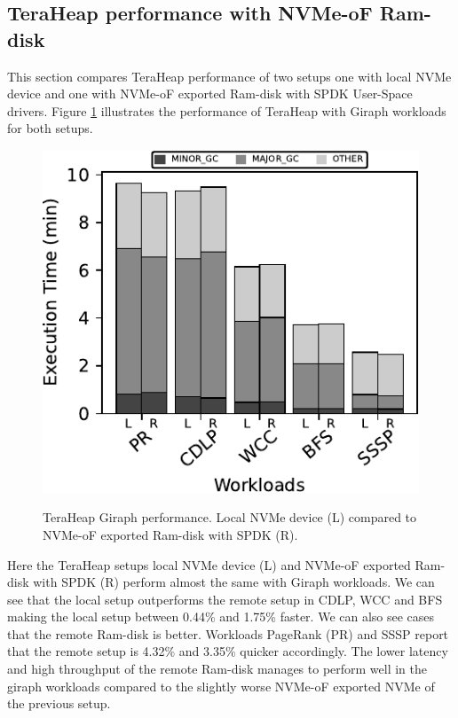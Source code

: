 \subsection{TeraHeap performance with NVMe-oF Ram-disk}
\par This section compares TeraHeap performance of two setups one with local NVMe device and one with NVMe-oF exported Ram-disk with SPDK User-Space drivers. Figure \ref{fig:ram_giraph} illustrates the performance of TeraHeap with Giraph workloads for both setups.
\begin{figure}[H]
  \includegraphics[width=\linewidth]{figures/ram_giraph.pdf}\\
\caption{TeraHeap Giraph performance. Local NVMe device (L) compared to NVMe-oF exported Ram-disk with SPDK (R).}
\label{fig:ram_giraph}
\end{figure}
Here the TeraHeap setups local NVMe device (L) and NVMe-oF exported Ram-disk with
SPDK (R) perform almost the same with Giraph workloads. We can see that the local setup
outperforms the remote setup in CDLP, WCC and BFS making the local setup between 0.44\% and 1.75\% faster. We can also see cases that the remote Ram-disk is better. Workloads PageRank (PR) and SSSP report that the remote
setup is 4.32\% and 3.35\% quicker accordingly. The lower latency and high throughput of the remote Ram-disk manages to perform well in the giraph workloads compared to the slightly worse NVMe-oF exported NVMe of the previous setup.

